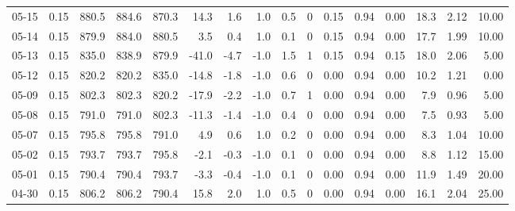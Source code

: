 \begin{threeparttable}
{\begin{tabular}{lrrrrrrrrrrrrrrr}
  05-15 &     0.15 & 880.5 & 884.6 & 870.3 &       14.3 &            1.6 &                      1.0 &                 0.5 &              0 &       0.15 &      0.94 &           0.00 &             18.3 &            2.12 &                  10.00 \\
  05-14 &     0.15 & 879.9 & 884.0 & 880.5 &        3.5 &            0.4 &                      1.0 &                 0.1 &              0 &       0.15 &      0.94 &           0.00 &             17.7 &            1.99 &                  10.00 \\
  05-13 &     0.15 & 835.0 & 838.9 & 879.9 &      -41.0 &           -4.7 &                     -1.0 &                 1.5 &              1 &       0.15 &      0.94 &           0.15 &             18.0 &            2.06 &                   5.00 \\
  05-12 &     0.15 & 820.2 & 820.2 & 835.0 &      -14.8 &           -1.8 &                     -1.0 &                 0.6 &              0 &       0.00 &      0.94 &           0.00 &             10.2 &            1.21 &                   0.00 \\
  05-09 &     0.15 & 802.3 & 802.3 & 820.2 &      -17.9 &           -2.2 &                     -1.0 &                 0.7 &              1 &       0.00 &      0.94 &           0.00 &              7.9 &            0.96 &                   5.00 \\
  05-08 &     0.15 & 791.0 & 791.0 & 802.3 &      -11.3 &           -1.4 &                     -1.0 &                 0.4 &              0 &       0.00 &      0.94 &           0.00 &              7.5 &            0.93 &                   5.00 \\
  05-07 &     0.15 & 795.8 & 795.8 & 791.0 &        4.9 &            0.6 &                      1.0 &                 0.2 &              0 &       0.00 &      0.94 &           0.00 &              8.3 &            1.04 &                  10.00 \\
  05-02 &     0.15 & 793.7 & 793.7 & 795.8 &       -2.1 &           -0.3 &                     -1.0 &                 0.1 &              0 &       0.00 &      0.94 &           0.00 &              8.8 &            1.12 &                  15.00 \\
  05-01 &     0.15 & 790.4 & 790.4 & 793.7 &       -3.3 &           -0.4 &                     -1.0 &                 0.1 &              0 &       0.00 &      0.94 &           0.00 &             11.9 &            1.49 &                  20.00 \\
  04-30 &     0.15 & 806.2 & 806.2 & 790.4 &       15.8 &            2.0 &                      1.0 &                 0.5 &              0 &       0.00 &      0.94 &           0.00 &             16.1 &            2.04 &                  25.00 \\

\end{tabular}}
\end{threeparttable}

